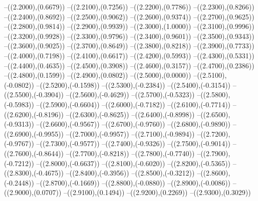 {	--({\sx*(2.2000)},{\sy*(0.6679)})
	--({\sx*(2.2100)},{\sy*(0.7256)})
	--({\sx*(2.2200)},{\sy*(0.7786)})
	--({\sx*(2.2300)},{\sy*(0.8266)})
	--({\sx*(2.2400)},{\sy*(0.8692)})
	--({\sx*(2.2500)},{\sy*(0.9062)})
	--({\sx*(2.2600)},{\sy*(0.9374)})
	--({\sx*(2.2700)},{\sy*(0.9625)})
	--({\sx*(2.2800)},{\sy*(0.9814)})
	--({\sx*(2.2900)},{\sy*(0.9939)})
	--({\sx*(2.3000)},{\sy*(1.0000)})
	--({\sx*(2.3100)},{\sy*(0.9996)})
	--({\sx*(2.3200)},{\sy*(0.9928)})
	--({\sx*(2.3300)},{\sy*(0.9796)})
	--({\sx*(2.3400)},{\sy*(0.9601)})
	--({\sx*(2.3500)},{\sy*(0.9343)})
	--({\sx*(2.3600)},{\sy*(0.9025)})
	--({\sx*(2.3700)},{\sy*(0.8649)})
	--({\sx*(2.3800)},{\sy*(0.8218)})
	--({\sx*(2.3900)},{\sy*(0.7733)})
	--({\sx*(2.4000)},{\sy*(0.7198)})
	--({\sx*(2.4100)},{\sy*(0.6617)})
	--({\sx*(2.4200)},{\sy*(0.5993)})
	--({\sx*(2.4300)},{\sy*(0.5331)})
	--({\sx*(2.4400)},{\sy*(0.4635)})
	--({\sx*(2.4500)},{\sy*(0.3908)})
	--({\sx*(2.4600)},{\sy*(0.3157)})
	--({\sx*(2.4700)},{\sy*(0.2386)})
	--({\sx*(2.4800)},{\sy*(0.1599)})
	--({\sx*(2.4900)},{\sy*(0.0802)})
	--({\sx*(2.5000)},{\sy*(0.0000)})
	--({\sx*(2.5100)},{\sy*(-0.0802)})
	--({\sx*(2.5200)},{\sy*(-0.1598)})
	--({\sx*(2.5300)},{\sy*(-0.2384)})
	--({\sx*(2.5400)},{\sy*(-0.3154)})
	--({\sx*(2.5500)},{\sy*(-0.3904)})
	--({\sx*(2.5600)},{\sy*(-0.4629)})
	--({\sx*(2.5700)},{\sy*(-0.5323)})
	--({\sx*(2.5800)},{\sy*(-0.5983)})
	--({\sx*(2.5900)},{\sy*(-0.6604)})
	--({\sx*(2.6000)},{\sy*(-0.7182)})
	--({\sx*(2.6100)},{\sy*(-0.7714)})
	--({\sx*(2.6200)},{\sy*(-0.8196)})
	--({\sx*(2.6300)},{\sy*(-0.8625)})
	--({\sx*(2.6400)},{\sy*(-0.8998)})
	--({\sx*(2.6500)},{\sy*(-0.9313)})
	--({\sx*(2.6600)},{\sy*(-0.9567)})
	--({\sx*(2.6700)},{\sy*(-0.9760)})
	--({\sx*(2.6800)},{\sy*(-0.9890)})
	--({\sx*(2.6900)},{\sy*(-0.9955)})
	--({\sx*(2.7000)},{\sy*(-0.9957)})
	--({\sx*(2.7100)},{\sy*(-0.9894)})
	--({\sx*(2.7200)},{\sy*(-0.9767)})
	--({\sx*(2.7300)},{\sy*(-0.9577)})
	--({\sx*(2.7400)},{\sy*(-0.9326)})
	--({\sx*(2.7500)},{\sy*(-0.9014)})
	--({\sx*(2.7600)},{\sy*(-0.8644)})
	--({\sx*(2.7700)},{\sy*(-0.8218)})
	--({\sx*(2.7800)},{\sy*(-0.7740)})
	--({\sx*(2.7900)},{\sy*(-0.7212)})
	--({\sx*(2.8000)},{\sy*(-0.6637)})
	--({\sx*(2.8100)},{\sy*(-0.6020)})
	--({\sx*(2.8200)},{\sy*(-0.5365)})
	--({\sx*(2.8300)},{\sy*(-0.4675)})
	--({\sx*(2.8400)},{\sy*(-0.3956)})
	--({\sx*(2.8500)},{\sy*(-0.3212)})
	--({\sx*(2.8600)},{\sy*(-0.2448)})
	--({\sx*(2.8700)},{\sy*(-0.1669)})
	--({\sx*(2.8800)},{\sy*(-0.0880)})
	--({\sx*(2.8900)},{\sy*(-0.0086)})
	--({\sx*(2.9000)},{\sy*(0.0707)})
	--({\sx*(2.9100)},{\sy*(0.1494)})
	--({\sx*(2.9200)},{\sy*(0.2269)})
	--({\sx*(2.9300)},{\sy*(0.3029)})
}
